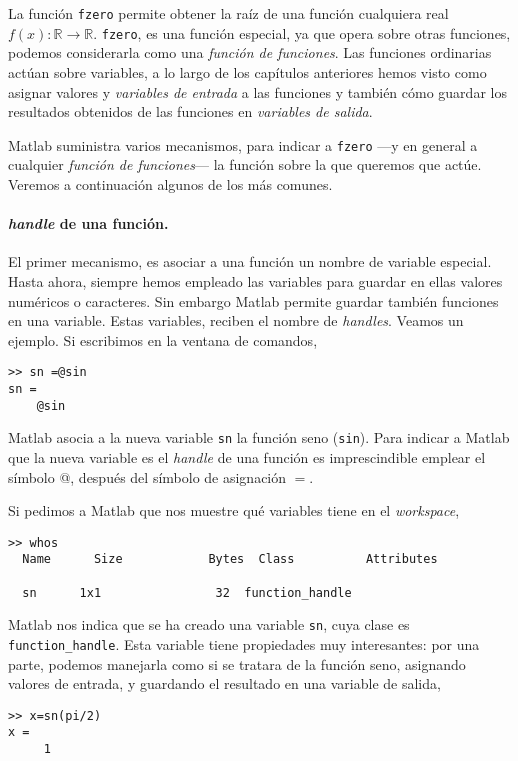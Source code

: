 La función \texttt{fzero} permite obtener la raíz de una función cualquiera real $f(x):\mathbb{R} \rightarrow \mathbb{R}$. \texttt{fzero}, es una función especial, ya que opera sobre otras funciones, podemos considerarla como una \emph{función de funciones}. Las funciones ordinarias actúan sobre variables, a lo largo de los capítulos anteriores hemos visto como asignar valores y \emph{variables de entrada} a las funciones y también cómo guardar los resultados obtenidos de las funciones en \emph{variables de salida}.

Matlab suministra varios mecanismos, para indicar a \texttt{fzero} ---y en general a cualquier \emph{función de funciones}--- la función sobre la que queremos que actúe. Veremos a continuación algunos de los más comunes.

\paragraph{\emph{handle} de una función.} El primer mecanismo, es asociar a una función un nombre de variable especial. Hasta ahora, siempre hemos empleado las variables para guardar en ellas valores numéricos o caracteres. Sin embargo Matlab permite guardar también funciones en una variable. Estas variables, reciben el nombre de \emph{handles}. Veamos un ejemplo. Si escribimos en la ventana de comandos, 

\begin{verbatim}
>> sn =@sin
sn = 
    @sin
\end{verbatim}

Matlab asocia a la nueva variable \texttt{sn} la función seno (\texttt{sin}). Para indicar a Matlab que la nueva variable es el \emph{handle} de una función es imprescindible emplear el símbolo @, después del símbolo de asignación $=$.

Si pedimos a Matlab que nos muestre qué variables tiene en el \emph{workspace},

\begin{verbatim}
>> whos
  Name      Size            Bytes  Class          Attributes

  sn      1x1                32  function_handle              

\end{verbatim}

Matlab nos indica que se ha creado una variable \texttt{sn}, cuya clase es \texttt{function\_handle}. Esta variable tiene propiedades muy interesantes: por una parte, podemos manejarla como si se tratara de la función seno, asignando valores de entrada, y guardando el resultado en una variable de salida, 
\begin{verbatim}
>> x=sn(pi/2)
x =
     1
\end{verbatim}


